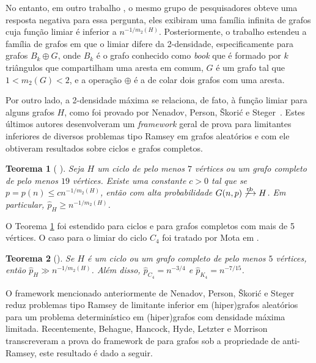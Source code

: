 \documentclass[12pt,a4paper]{book}
\def\rbarrow{\xrightarrow[]{\raisebox{0.0mm}[0mm]{$\scriptstyle \rm rb$}}}
\newtheorem{teorema}{Teorema}[chapter]
\begin{document}
No entanto, em outro trabalho \cite{KoKoMo16+}, o mesmo grupo de pesquisadores obteve uma resposta negativa para essa pergunta, eles exibiram uma família infinita de grafos cuja função limiar é inferior a $n^{-1/m_2(H)}$. 
Posteriormente, o trabalho \cite{araujo2022anti} estendeu a família de grafos em que o limiar difere da 2-densidade, especificamente para grafos $B_k \oplus G$, onde $B_k$ é o grafo conhecido como \emph{book} que é formado por $k$ triângulos que compartilham uma aresta em comum, $G$ é um grafo tal que $1< m_2(G)< 2$, e a operação $\oplus$ é a de colar dois grafos com uma aresta.


Por outro lado, a 2-densidade máxima se relaciona, de fato, à função limiar para alguns grafos $H$, como foi provado por Nenadov,
Person, Škorić e Steger~\cite{NePeSkSt14}.
Estes últimos autores desenvolveram um \emph{framework} geral de prova para limitantes inferiores de diversos problemas tipo Ramsey em grafos aleatórios e com ele obtiveram resultados sobre ciclos e grafos completos.

\begin{teorema}[%
\cite{NePeSkSt14}]
\label{teo:nen}
  Seja $H$ um ciclo de pelo menos $7$ vértices ou um grafo completo de pelo menos $19$ vértices. 
  Existe uma constante $c > 0$ tal que se
  $p=p(n)\leq cn^{-1/m_2(H)}$, 
  então com alta probabilidade $G(n,p)\not\rbarrow  H$. 
  Em particular, $\hat{p}_H \geq n^{-1/m_2(H)}$.
\end{teorema}


O Teorema \ref{teo:nen} foi estendido para ciclos \cite{barros2021anti} e para grafos completos \cite{kohayakawa2019anti} com mais de 5 vértices. 
O caso para o limiar do ciclo $C_4$ foi tratado por Mota em \cite{mota2017advances}.

\begin{teorema}    
[\cite{barros2021anti, kohayakawa2019anti, mota2017advances}]
\label{teo:cyclecomplete} 
Se $H$ é um ciclo ou um grafo completo de pelo menos $5$ vértices, 
então $\hat{p}_{H} \gg n^{-1/m_2(H)}$. 
Além disso, $\hat{p}_{C_4} = n^{-3/4}$ 
e $\hat{p}_{K_4} = n^{-7/15}$.
\end{teorema}

    O framework mencionado anteriormente de Nenadov,
Person, Škorić e Steger~\cite{NePeSkSt14} reduz problemas tipo Ramsey de limitante inferior em (hiper)grafos aleatórios para um problema determinístico em (hiper)grafos com densidade máxima limitada.
Recentemente, Behague, Hancock, Hyde, Letzter e Morrison \cite{behague2024thresholds} transcreveram a prova do framework de \cite{NePeSkSt14} para grafos sob a propriedade de anti-Ramsey, este resultado é dado a seguir.
\end{document}
